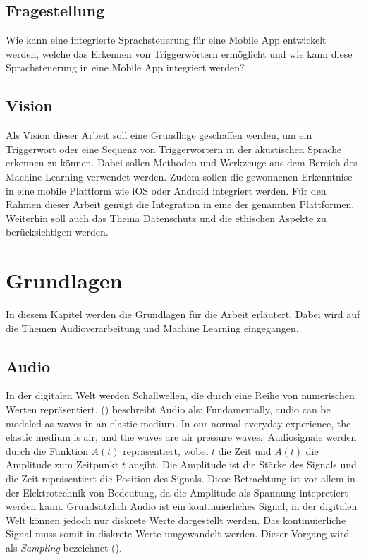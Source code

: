 \documentclass[11pt,a4paper]{article}
\begin{document}
\subsection{Fragestellung}
Wie kann eine integrierte Sprachsteuerung für eine Mobile App entwickelt werden, welche
das Erkennen von Triggerwörtern ermöglicht und wie kann diese Sprachsteuerung in eine
Mobile App integriert werden?


\subsection{Vision}
Als Vision dieser Arbeit soll eine Grundlage geschaffen werden, um ein Triggerwort
oder eine Sequenz von Triggerwörtern in der akustischen Sprache erkennen zu können.
Dabei sollen Methoden und Werkzeuge aus dem Bereich des Machine Learning verwendet werden.
Zudem sollen die gewonnenen Erkenntnise in eine mobile Plattform wie iOS oder Android integriert
werden. Für den Rahmen dieser Arbeit genügt die Integration in eine der genannten Plattformen.
Weiterhin soll auch das Thema Datenschutz und die ethischen Aspekte zu berücksichtigen werden. 

\newpage \section{Grundlagen}\label{sec:grundlagen}
In diesem Kapitel werden die Grundlagen für die Arbeit erläutert. Dabei wird auf die Themen
Audioverarbeitung und Machine Learning eingegangen.

\subsection{Audio}
In der digitalen Welt werden Schallwellen, die durch eine Reihe von numerischen Werten
repräsentiert. (\cite[p.9]{somberg2019audioapi}) beschreibt Audio als: \glqq Fundamentally,
audio can be modeled as waves in an elastic medium. In our normal everyday experience, the elastic
medium is air, and the waves are air pressure waves.\grqq \ Audiosignale werden durch die Funktion
\(A(t)\) repräsentiert, wobei \(t\) die Zeit und \(A(t)\) die Amplitude zum
Zeitpunkt \(t\) angibt. Die Amplitude ist die Stärke des Signals und die Zeit repräsentiert die
Position des Signals. Diese Betrachtung ist vor allem in der Elektrotechnik
von Bedeutung, da die Amplitude als Spannung intepretiert werden kann. Grundsätzlich Audio ist ein 
kontinuierliches Signal, in der digitalen Welt können jedoch nur diskrete Werte dargestellt werden.
Das kontinuierliche Signal muss somit in diskrete Werte umgewandelt werden. Dieser Vorgang wird als
\textit{Sampling} bezeichnet (\cite[Chapter~3.1]{tarr2018hackaudio}). 
\end{document}
